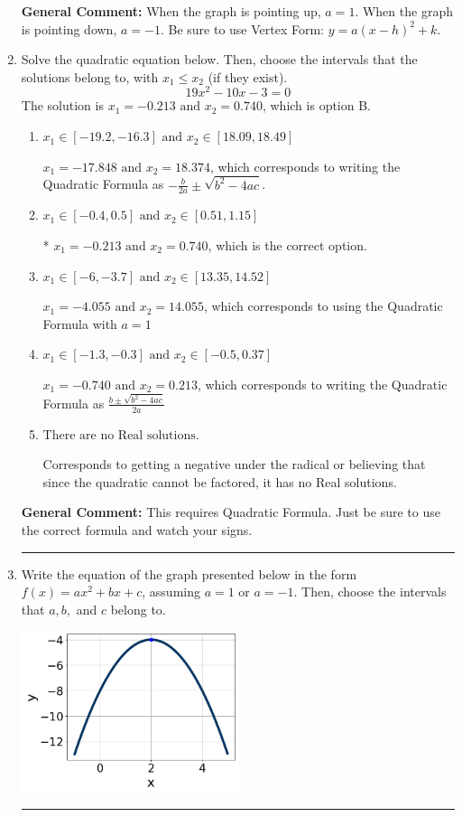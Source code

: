 \documentclass{extbook}[14pt]
\newcommand{\litem}[1]{\item #1

\rule{\textwidth}{0.4pt}}
\begin{document}
\begin{enumerate}
{\textbf{General Comment:} When the graph is pointing up, $a=1$. When the graph is pointing down, $a=-1$. Be sure to use Vertex Form: $y = a(x-h)^2+k$.
}
\litem{
Solve the quadratic equation below. Then, choose the intervals that the solutions belong to, with $x_1 \leq x_2$ (if they exist).
\[ 19x^{2} -10 x -3 = 0 \]The solution is \( x_1 = -0.213 \text{ and } x_2 = 0.740 \), which is option B.\begin{enumerate}[label=\Alph*.]
\item \( x_1 \in [-19.2, -16.3] \text{ and } x_2 \in [18.09, 18.49] \)

 $x_1 = -17.848 \text{ and } x_2 = 18.374$, which corresponds to writing the Quadratic Formula as $-\frac{b}{2a} \pm \sqrt{b^2 - 4ac}$.
\item \( x_1 \in [-0.4, 0.5] \text{ and } x_2 \in [0.51, 1.15] \)

* $x_1 = -0.213 \text{ and } x_2 = 0.740$, which is the correct option.
\item \( x_1 \in [-6, -3.7] \text{ and } x_2 \in [13.35, 14.52] \)

 $x_1 = -4.055 \text{ and } x_2 = 14.055$, which corresponds to using the Quadratic Formula with $a=1$
\item \( x_1 \in [-1.3, -0.3] \text{ and } x_2 \in [-0.5, 0.37] \)

 $x_1 = -0.740 \text{ and } x_2 = 0.213$, which corresponds to writing the Quadratic Formula as $\frac{b \pm \sqrt{b^2 - 4ac}}{2a}$
\item \( \text{There are no Real solutions.} \)

Corresponds to getting a negative under the radical or believing that since the quadratic cannot be factored, it has no Real solutions.
\end{enumerate}

\textbf{General Comment:} This requires Quadratic Formula. Just be sure to use the correct formula and watch your signs.
}
\litem{
Write the equation of the graph presented below in the form $f(x)=ax^2+bx+c$, assuming  $a=1$ or $a=-1$. Then, choose the intervals that $a, b,$ and $c$ belong to.

\begin{center}
    \includegraphics[width=0.5\textwidth]{../Figures/quadraticGraphToEquationB.png}
\end{center}


}
\end{enumerate}
\end{document}
